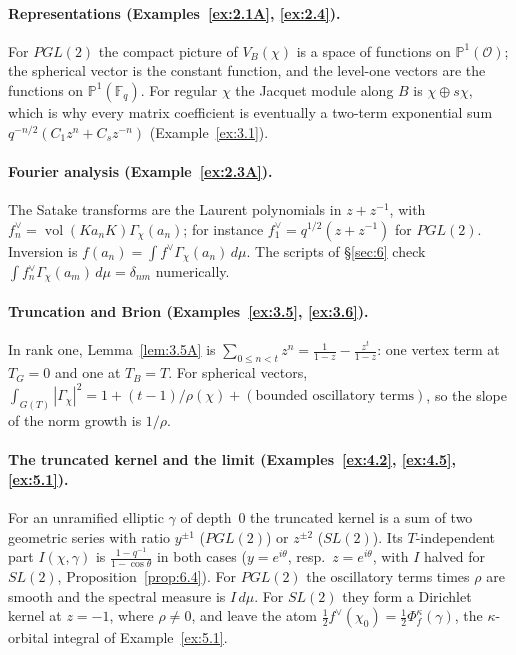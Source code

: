 \documentclass[12pt,letterpaper]{article}
\numberwithin{equation}{section}
\theoremstyle{plain}
\theoremstyle{remark}
\theoremstyle{plain}
\theoremstyle{definition}
\theoremstyle{remark}
\theoremstyle{remark}
\newcommand{\OO}{\mathcal{O}}
\DeclareMathOperator{\vol}{vol}
\begin{document}
\paragraph{Representations (Examples~\ref{ex:2.1A}, \ref{ex:2.4}).} For $PGL(2)$ the compact picture of $V_B(\chi)$ is a space of functions on $\mathbb{P}^1(\OO)$; the spherical vector is the constant function, and the level-one vectors are the functions on $\mathbb{P}^1(\mathbb{F}_q)$. For regular $\chi$ the Jacquet module along $B$ is $\chi\oplus s\chi$, which is why every matrix coefficient is eventually a two-term exponential sum $q^{-n/2}(C_1z^n+C_sz^{-n})$ (Example~\ref{ex:3.1}).

\paragraph{Fourier analysis (Example~\ref{ex:2.3A}).} The Satake transforms are the Laurent polynomials in $z+z^{-1}$, with $f_n^\vee=\vol(Ka_nK)\Gamma_\chi(a_n)$; for instance $f_1^\vee=q^{1/2}(z+z^{-1})$ for $PGL(2)$. Inversion is $f(a_n)=\int f^\vee\Gamma_\chi(a_n)\,d\mu$. The scripts of \S\ref{sec:6} check $\int f_n^\vee\Gamma_\chi(a_m)\,d\mu=\delta_{nm}$ numerically.

\paragraph{Truncation and Brion (Examples~\ref{ex:3.5}, \ref{ex:3.6}).} In rank one, Lemma~\ref{lem:3.5A} is $\sum_{0\le n<t}z^n=\frac1{1-z}-\frac{z^t}{1-z}$: one vertex term at $T_G=0$ and one at $T_B=T$. For spherical vectors, $\int_{G(T)}|\Gamma_\chi|^2=1+(t-1)/\rho(\chi)+(\text{bounded oscillatory terms})$, so the slope of the norm growth is $1/\rho$.

\paragraph{The truncated kernel and the limit (Examples~\ref{ex:4.2}, \ref{ex:4.5}, \ref{ex:5.1}).} For an unramified elliptic $\gamma$ of depth~$0$ the truncated kernel is a sum of two geometric series with ratio $y^{\pm1}$ ($PGL(2)$) or $z^{\pm2}$ ($SL(2)$). Its $T$-independent part $I(\chi,\gamma)$ is $\frac{1-q^{-1}}{1-\cos\theta}$ in both cases ($y=e^{i\theta}$, resp.\ $z=e^{i\theta}$, with $I$ halved for $SL(2)$, Proposition~\ref{prop:6.4}). For $PGL(2)$ the oscillatory terms times $\rho$ are smooth and the spectral measure is $I\,d\mu$. For $SL(2)$ they form a Dirichlet kernel at $z=-1$, where $\rho\ne0$, and leave the atom $\frac12f^\vee(\chi_0)=\frac12\Phi^\kappa_f(\gamma)$, the $\kappa$-orbital integral of Example~\ref{ex:5.1}.
\end{document}
